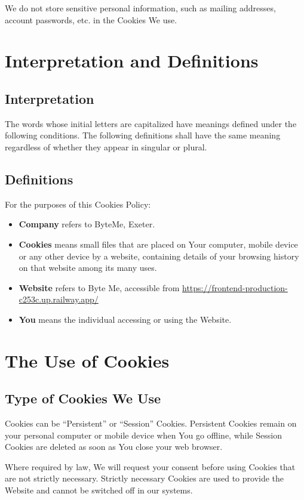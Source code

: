 \documentclass[11pt, a4paper]{report}
\begin{document}
\begin{itemize}
We do not store sensitive personal information, such as mailing addresses, account passwords, etc. in the Cookies We use.

\section*{Interpretation and Definitions}

\subsection*{Interpretation}
The words whose initial letters are capitalized have meanings defined under the following conditions. The following definitions shall have the same meaning regardless of whether they appear in singular or plural.

\subsection*{Definitions}
For the purposes of this Cookies Policy:

\begin{itemize}
	\item \textbf{Company} refers to ByteMe, Exeter.
	\item \textbf{Cookies} means small files that are placed on Your computer, mobile device or any other device by a website, containing details of your browsing history on that website among its many uses.
	\item \textbf{Website} refers to Byte Me, accessible from \url{https://frontend-production-c253c.up.railway.app/}
	\item \textbf{You} means the individual accessing or using the Website.
\end{itemize}

\section*{The Use of Cookies}

\subsection*{Type of Cookies We Use}
Cookies can be ``Persistent'' or ``Session'' Cookies. Persistent Cookies remain on your personal computer or mobile device when You go offline, while Session Cookies are deleted as soon as You close your web browser.

Where required by law, We will request your consent before using Cookies that are not strictly necessary. Strictly necessary Cookies are used to provide the Website and cannot be switched off in our systems.


\end{itemize}
\end{document}
